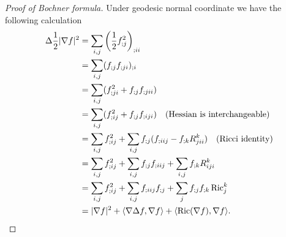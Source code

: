 \begin{proof}[Proof of Bochner formula]
    Under geodesic normal coordinate we have the following calculation
    \begin{align*}
        \Delta\frac{1}{2}|\nabla f|^2&=\sum_{i,j}\left(\frac{1}{2}f^2_{;j}\right)_{;ii}\\
        &=\sum_{i,j}(f_{;j}f_{;ji})_{;i}\\
        &=\sum_{i,j}(f^2_{;ji}+f_{;j}f_{;jii})\\
        &=\sum_{i,j}(f^2_{;ij}+f_{;j}f_{;iji})\quad\text{(Hessian is interchangeable)}\\
        &=\sum_{i,j}f^2_{;ij}+\sum_{i,j}f_{;j}(f_{;iij}-f_{;k}R_{jii}^k)\quad\text{(Ricci identity)}\\
        &=\sum_{i,j}f^2_{;ij}+\sum_{i,j}f_{;j}f_{;iij}+\sum_{i,j}f_{;k}R_{iji}^k\\
        &=\sum_{i,j}f^2_{;ij}+\sum_{i,j}f_{;iij}f_{;j}+\sum_{j}f_{;j}f_{;k}\operatorname{Ric}_j^k\\
        &=|\nabla f|^2+\langle\nabla\Delta f,\nabla f\rangle+\langle\operatorname{Ric}(\nabla f),\nabla f\rangle.\qedhere
    \end{align*}
\end{proof}

